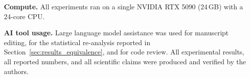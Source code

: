\documentclass[journal]{IEEEtran}
\begin{document}
\textbf{Compute.} All experiments ran on a single NVIDIA RTX 5090 (24\,GB)
with a 24-core CPU.

\textbf{AI tool usage.} Large language model assistance was used for
manuscript editing, for the statistical re-analysis reported in
Section~\ref{sec:results_equivalence}, and for code review. All experimental
results, all reported numbers, and all scientific claims were produced and
verified by the authors.



\end{document}
